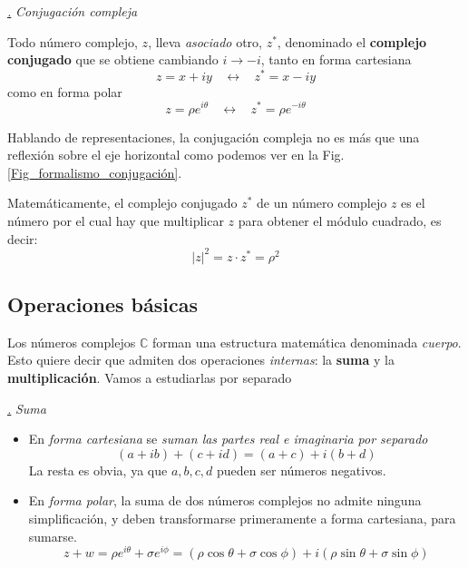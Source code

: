 \documentclass[a4paper,11pt]{book} %
\numberwithin{equation}{chapter}
\def\subsubiContadorIt{\par\addtocounter{subsubsection}{1}\underline{\it\thesubsubsection.}\hskip0.5cm \setcounter{subsubsubsectionIt}{0}}
\newcommand{\SubsubiIt}[1]{
		\subsubiContadorIt \textit{#1}
	}
\newcounter{subsubsubsectionIt}[subsubsection]
\begin{document}
			
			\SubsubiIt{Conjugación compleja}

Todo número complejo, $z$, lleva \textit{asociado} otro, $z^*$, denominado el \textbf{complejo conjugado} que se obtiene cambiando $i \to -i$, tanto en forma cartesiana
	\begin{equation}
	\boxed{z = x+i y ~~~~\leftrightarrow~~~~ z^* = x - i y}
	\end{equation}
como en forma polar
	\begin{equation}
	\boxed{z = \rho e^{i \theta} ~~~~\leftrightarrow~~~~ z^* = \rho e^{- i \theta}}
	\end{equation}

Hablando de representaciones, la conjugación compleja no es más que una reflexión sobre el eje horizontal como podemos ver en la Fig. \ref{Fig_formalismo_conjugación}.

Matemáticamente, el complejo conjugado $z^*$ de un número complejo $z$ es el número por el cual hay que multiplicar $z$ para obtener el módulo cuadrado, es decir:
	\begin{equation}
	\boxed{|z|^2 = z \cdot z^* = \rho^2}
	\end{equation}
			
			
		\subsection{Operaciones básicas}

Los números complejos ${\mathbb C}$ forman una estructura matemática denominada \textit{cuerpo}. Esto  quiere decir que admiten dos operaciones \textit{internas}: la \textbf{suma} y la \textbf{multiplicación}. Vamos a estudiarlas por separado


			\SubsubiIt{Suma}

\begin{itemize}
	\item En \textit{forma cartesiana} se \textit{suman las partes real e imaginaria por separado}
	\begin{equation}
(a + i b) + (c + i d) = (a+c) + i (b+d)
	\end{equation} 
La resta es obvia, ya que $a,b,c,d$ pueden ser números negativos. 	

	\item En  \textit{forma polar}, la suma de dos números complejos no admite ninguna simplificación, y deben transformarse primeramente a forma cartesiana, para sumarse. 
	\begin{equation}
z + w = \rho e^{i\theta} + \sigma e^{i\phi} = (\rho\cos\theta + \sigma\cos\phi) + i(\rho\sin\theta +  \sigma\sin\phi) 
	\end{equation}	
\end{itemize}
			
\end{document}
